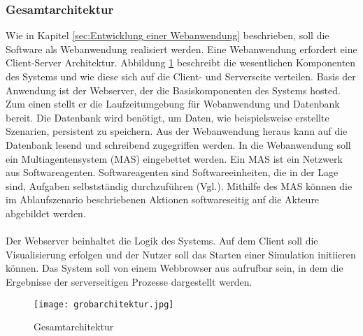 \subsubsection{Gesamtarchitektur}\label{GA} 
Wie in Kapitel \ref{sec:Entwicklung einer Webanwendung} beschrieben, soll die Software als Webanwendung realisiert werden. Eine Webanwendung erfordert eine Client-Server Architektur. Abbildung \ref{Gesamtarchitektur} beschreibt die wesentlichen Komponenten des Systems und wie diese sich auf die Client- und Serverseite verteilen. Basis der Anwendung ist der Webserver, der die Basiskomponenten des Systems hosted. Zum einen stellt er die Laufzeitumgebung für Webanwendung und Datenbank bereit. Die Datenbank wird benötigt, um Daten, wie beispielsweise erstellte Szenarien, persistent zu speichern. Aus der Webanwendung heraus kann auf die Datenbank lesend und schreibend zugegriffen werden. In die Webanwendung soll ein Multiagentensystem (MAS) eingebettet werden. Ein MAS ist ein Netzwerk aus Softwareagenten. Softwareagenten sind Softwareeinheiten, die in  der Lage sind, Aufgaben selbstständig durchzuführen (Vgl.\cite{mas}). Mithilfe des MAS können die im Ablaufszenario beschriebenen Aktionen softwareseitig auf die Akteure abgebildet werden.
\\\\
Der Webserver beinhaltet die Logik des Systems. Auf dem Client soll die Visualisierung erfolgen und der Nutzer soll das Starten einer Simulation initiieren können. Das System soll von einem Webbrowser aus aufrufbar sein, in dem die Ergebnisse der serverseitigen Prozesse dargestellt werden. 

\begin{figure}[h!]
	\centering
		\texttt{[image: grobarchitektur.jpg]}        
		\caption{Gesamtarchitektur}
	\label{Gesamtarchitektur}
\end{figure} 
\newpage
